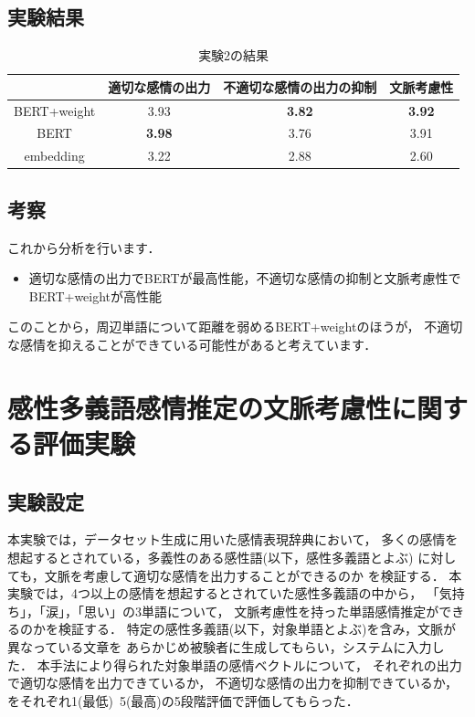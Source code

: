 	\subsection{実験結果}
	\begin{table}[H]
		\centering
		\caption{実験2の結果}
		\label{normal_word_result}
			\begin{tabular}{cccc}
				\hline
				& 適切な感情の出力 & 不適切な感情の出力の抑制 & 文脈考慮性 \\
				\hline \hline
				BERT+weight & 3.93 & \textbf{3.82} & \textbf{3.92} \\
				BERT & \textbf{3.98} & 3.76 & 3.91 \\
				embedding & 3.22 & 2.88 & 2.60 \\
				\hline
			\end{tabular}
		\end{table}
	\subsection{考察}
	これから分析を行います．
	\begin{itemize}
		\item 適切な感情の出力でBERTが最高性能，不適切な感情の抑制と文脈考慮性でBERT+weightが高性能
	\end{itemize}
	このことから，周辺単語について距離を弱めるBERT+weightのほうが，
	不適切な感情を抑えることができている可能性があると考えています．

\section{感性多義語感情推定の文脈考慮性に関する評価実験}
	\subsection{実験設定}
	本実験では，データセット生成に用いた感情表現辞典において，
	多くの感情を想起するとされている，多義性のある感性語(以下，感性多義語とよぶ)
	に対しても，文脈を考慮して適切な感情を出力することができるのか
	を検証する．
	本実験では，4つ以上の感情を想起するとされていた感性多義語の中から，
	「気持ち」，「涙」，「思い」の3単語について，
	文脈考慮性を持った単語感情推定ができるのかを検証する．
	特定の感性多義語(以下，対象単語とよぶ)を含み，文脈が異なっている文章を
	あらかじめ被験者に生成してもらい，システムに入力した．
	本手法により得られた対象単語の感情ベクトルについて，
	それぞれの出力で適切な感情を出力できているか，
	不適切な感情の出力を抑制できているか，
	をそれぞれ1(最低)~5(最高)の5段階評価で評価してもらった．
	

